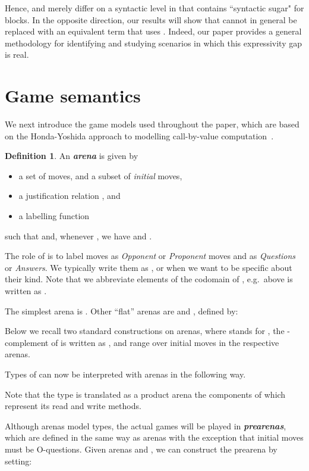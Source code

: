 \documentclass{CSML}
\theoremstyle{definition}\newtheorem{definition}[thm]{Definition}
\theoremstyle{definition}\newtheorem{example}[thm]{Example}
\theoremstyle{definition}\newtheorem{proposition}[thm]{Proposition}
\theoremstyle{definition}\newtheorem{lemma}[thm]{Lemma}
\theoremstyle{definition}\newtheorem{theorem}[thm]{Theorem}
\theoremstyle{definition}\newtheorem{corollary}[thm]{Corollary}
\theoremstyle{definition}\newtheorem{remark}[thm]{Remark}
\newcommand\nt[1]{#1}
\newcommand\boldemph[1]{\emph{\textbf{#1}}}
\begin{document}
Hence, 
 and  merely differ on a syntactic level in that 
contains ``syntactic sugar" for blocks. In the opposite direction, 
our results will show that  cannot in general be replaced
with an equivalent term that uses . Indeed, our paper provides 
a general methodology for identifying and studying scenarios 
in which this expressivity gap is real.



\section{Game semantics}


We next introduce the game models used throughout the paper,
which are based on the Honda-Yoshida approach to modelling call-by-value computation~\cite{HY97}.
\begin{definition}
An \boldemph{arena}  is given by
\begin{itemize}\item a set  of moves, and a subset  of \emph{initial} moves,
  \item a justification relation , and
  \item a labelling function \,
\end{itemize}such that  and, whenever ,
we have  and . 
\end{definition}
The role of  is to label moves as \emph{Opponent} or \emph{Proponent} moves and
as \emph{Questions} or \emph{Answers}. We typically write them as , or  when we want to be specific about their kind.
\nt{Note that we abbreviate elements of the codomain of , e.g.\  above is written as .}

The simplest arena is .
Other ``flat'' arenas are  and , defined by:

Below we recall two standard constructions on arenas, 
where  stands for ,
the -complement of  is written as , and  range
over initial moves in the respective arenas.

\bigskip

Types of  can now be interpreted with arenas in the following way.

Note that the type  is translated as a product arena the components of which represent its read and write methods.

Although arenas model types, the actual games will be played in \boldemph{prearenas},
which are defined in the same way as arenas with the exception that initial moves must
be O-questions. Given arenas  and  , we can construct the prearena  by setting:
\end{document}
